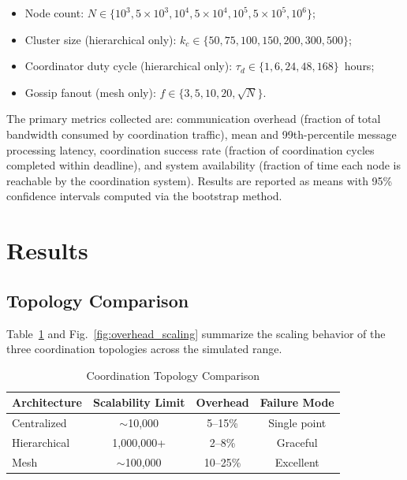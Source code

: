 \documentclass[journal]{IEEEtran}
\begin{document}
\begin{itemize}
    \item Node count: $N \in \{10^3, 5 \times 10^3, 10^4, 5 \times 10^4, 10^5, 5 \times 10^5, 10^6\}$;
    \item Cluster size (hierarchical only): $k_c \in \{50, 75, 100, 150, 200, 300, 500\}$;
    \item Coordinator duty cycle (hierarchical only): $\tau_d \in \{1, 6, 24, 48, 168\}$~hours;
    \item Gossip fanout (mesh only): $f \in \{3, 5, 10, 20, \sqrt{N}\}$.
\end{itemize}

The primary metrics collected are: communication overhead (fraction of total bandwidth consumed by coordination traffic), mean and 99th-percentile message processing latency, coordination success rate (fraction of coordination cycles completed within deadline), and system availability (fraction of time each node is reachable by the coordination system). Results are reported as means with 95\% confidence intervals computed via the bootstrap method.


\section{Results}

\subsection{Topology Comparison}

Table~\ref{tab:topology_comparison} and Fig.~\ref{fig:overhead_scaling} summarize the scaling behavior of the three coordination topologies across the simulated range.

\begin{table}[t]
    \centering
    \caption{Coordination Topology Comparison}
    \label{tab:topology_comparison}
    \begin{tabular}{@{}lccc@{}}
        \toprule
        \textbf{Architecture} & \textbf{Scalability Limit} & \textbf{Overhead} & \textbf{Failure Mode} \\
        \midrule
        Centralized  & $\sim$10{,}000    & 5--15\%  & Single point \\
        Hierarchical & 1{,}000{,}000+    & 2--8\%   & Graceful \\
        Mesh         & $\sim$100{,}000   & 10--25\% & Excellent \\
        \bottomrule
    \end{tabular}
\end{table}
\end{document}
